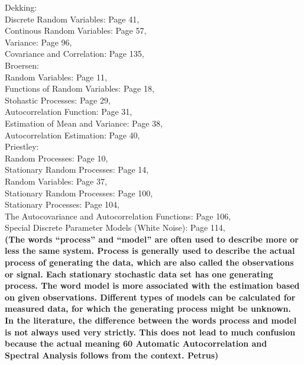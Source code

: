\documentclass[a4paper,12pt,oneside]{memoir}
\begin{document}
            Dekking:\\
            Discrete Random Variables: Page 41,\\
            Continous Random Variables: Page 57,\\
            Variance: Page 96,\\
            Covariance and Correlation: Page 135,\\


            Broersen:\\
            Random Variables: Page 11,\\
            Functions of Random Variables: Page 18,\\
            Stohastic Processes: Page 29,\\
            Autocorrelation Function: Page 31,\\
            Estimation of Mean and Variance: Page 38,\\
            Autocorrelation Estimation: Page 40,\\

            Priestley:\\
            Random Processes: Page 10,\\
            Stationary Random Processes: Page 14,\\
            Random Variables: Page 37,\\
            Stationary Random Processes: Page 100,\\
            Stationary Processes: Page 104,\\
            The Autocovariance and Autocorrelation Functions: Page 106,\\
            Special Discrete Parameter Models (White Noise): Page 114,\\

            \textbf{(The words “process” and “model” are often used to describe more or less the same
            system. Process is generally used to describe the actual process of generating the
            data, which are also called the observations or signal. Each stationary stochastic
            data set has one generating process. The word model is more associated with the
            estimation based on given observations. Different types of models can be calculated
            for measured data, for which the generating process might be unknown. In the
            literature, the difference between the words process and model is not always used
            very strictly. This does not lead to much confusion because the actual meaning
            60 Automatic Autocorrelation and Spectral Analysis
            follows from the context. Petrus)}
   
\end{document}
